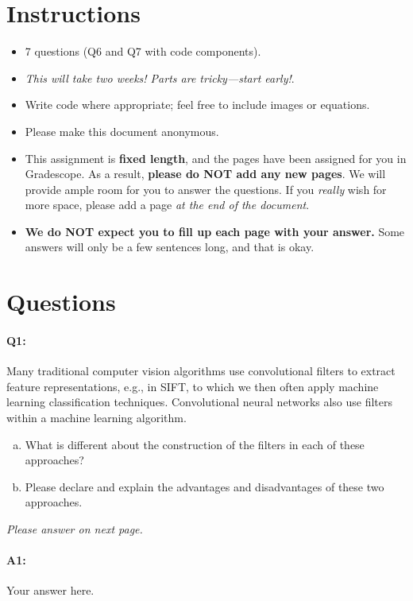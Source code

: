 \section*{Instructions}
\begin{itemize}
  \item 7 questions (Q6 and Q7 with code components).
  \item \emph{This will take two weeks! Parts are tricky---start early!}.
  \item Write code where appropriate; feel free to include images or equations.
  \item Please make this document anonymous.
  \item This assignment is \textbf{fixed length}, and the pages have been assigned for you in Gradescope. As a result, \textbf{please do NOT add any new pages}. We will provide ample room for you to answer the questions. If you \emph{really} wish for more space, please add a page \emph{at the end of the document}.
  \item \textbf{We do NOT expect you to fill up each page with your answer.} Some answers will only be a few sentences long, and that is okay.
\end{itemize}

\section*{Questions}


\paragraph{Q1:} Many traditional computer vision algorithms use convolutional filters to extract feature representations, e.g., in SIFT, to which we then often apply machine learning classification techniques. Convolutional neural networks also use filters within a machine learning algorithm.

\begin{enumerate} [(a)]
\item What is different about the construction of the filters in each of these approaches? 
\item Please declare and explain the advantages and disadvantages of these two approaches.
\end{enumerate}
\emph{Please answer on next page.}

\pagebreak
\paragraph{A1:} Your answer here.

